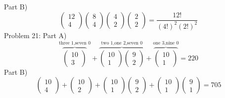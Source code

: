 \documentclass{article}
\begin{document}
	Part B)
	$$
	\left(\begin{array}{c}
	12\\
	4
	\end{array}\right)
	\left(\begin{array}{c}
	8\\
	4
	\end{array}\right)
	\left(\begin{array}{c}
	4\\
	2
	\end{array}\right)
	\left(\begin{array}{c}
	2\\
	2
	\end{array}\right)
	=
	\frac{12!}{(4!)^2(2!)^2}
	$$
	Problem 21: Part A)
	$$
	\overbrace{\left(\begin{array}{c}
	10\\
	3
	\end{array}\right)}^{\mbox{three 1,seven 0}}
	+
	\overbrace{\left(\begin{array}{c}
	10\\
	1
	\end{array}\right)
	\left(\begin{array}{c}
	9\\
	2
	\end{array}\right)	
	}^{\mbox{two 1,one 2,seven 0}}
	+
	\overbrace{\left(\begin{array}{c}
	10\\
	1
	\end{array}\right)}^{\mbox{one 3,nine 0}}
	=
	220
	$$
	Part B)
	$$
	\left(\begin{array}{c}
	10\\
	4
	\end{array}\right)
	+
	\left(\begin{array}{c}
	10\\
	2
	\end{array}\right)
	+
	\left(\begin{array}{c}
	10\\
	1
	\end{array}\right)
	\left(\begin{array}{c}
	9\\
	2
	\end{array}\right)
	+
	\left(\begin{array}{c}
	10\\
	1
	\end{array}\right)
	\left(\begin{array}{c}
	9\\
	1
	\end{array}\right)
	=
	705
	$$
\end{document}
